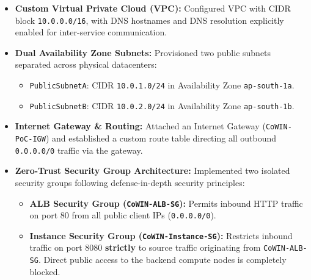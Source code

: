 \documentclass[11pt,a4paper]{article}
\begin{document}
\begin{itemize}
    \item \textbf{Custom Virtual Private Cloud (VPC):} Configured VPC with CIDR block \texttt{10.0.0.0/16}, with DNS hostnames and DNS resolution explicitly enabled for inter-service communication.
    \item \textbf{Dual Availability Zone Subnets:} Provisioned two public subnets separated across physical datacenters:
    \begin{itemize}
        \item \texttt{PublicSubnetA}: CIDR \texttt{10.0.1.0/24} in Availability Zone \texttt{ap-south-1a}.
        \item \texttt{PublicSubnetB}: CIDR \texttt{10.0.2.0/24} in Availability Zone \texttt{ap-south-1b}.
    \end{itemize}
    \item \textbf{Internet Gateway \& Routing:} Attached an Internet Gateway (\texttt{CoWIN-PoC-IGW}) and established a custom route table directing all outbound \texttt{0.0.0.0/0} traffic via the gateway.
    \item \textbf{Zero-Trust Security Group Architecture:} Implemented two isolated security groups following defense-in-depth security principles:
    \begin{itemize}
        \item \textbf{ALB Security Group (\texttt{CoWIN-ALB-SG}):} Permits inbound HTTP traffic on port 80 from all public client IPs (\texttt{0.0.0.0/0}).
        \item \textbf{Instance Security Group (\texttt{CoWIN-Instance-SG}):} Restricts inbound traffic on port 8080 \textbf{strictly} to source traffic originating from \texttt{CoWIN-ALB-SG}. Direct public access to the backend compute nodes is completely blocked.
    \end{itemize}
\end{itemize}

\begin{center}
\end{center}
\end{document}
